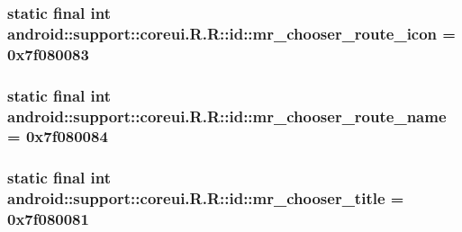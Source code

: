 \hypertarget{classandroid_1_1support_1_1coreui_1_1_r_1_1id_300792e0c2b02c1f4a87d5d8d527b6d7}{
\subsubsection[{mr\_\-chooser\_\-route\_\-icon}]{\setlength{\rightskip}{0pt plus 5cm}static final int android::support::coreui.R.R::id::mr\_\-chooser\_\-route\_\-icon = 0x7f080083}}
\label{classandroid_1_1support_1_1coreui_1_1_r_1_1id_300792e0c2b02c1f4a87d5d8d527b6d7}


\hypertarget{classandroid_1_1support_1_1coreui_1_1_r_1_1id_7d281b3d2cd3d4bb1bef3b256ccf99d1}{
\subsubsection[{mr\_\-chooser\_\-route\_\-name}]{\setlength{\rightskip}{0pt plus 5cm}static final int android::support::coreui.R.R::id::mr\_\-chooser\_\-route\_\-name = 0x7f080084}}
\label{classandroid_1_1support_1_1coreui_1_1_r_1_1id_7d281b3d2cd3d4bb1bef3b256ccf99d1}


\hypertarget{classandroid_1_1support_1_1coreui_1_1_r_1_1id_c593eb4ad3804b47cdc5b8241db21855}{
\subsubsection[{mr\_\-chooser\_\-title}]{\setlength{\rightskip}{0pt plus 5cm}static final int android::support::coreui.R.R::id::mr\_\-chooser\_\-title = 0x7f080081}}
\label{classandroid_1_1support_1_1coreui_1_1_r_1_1id_c593eb4ad3804b47cdc5b8241db21855}


